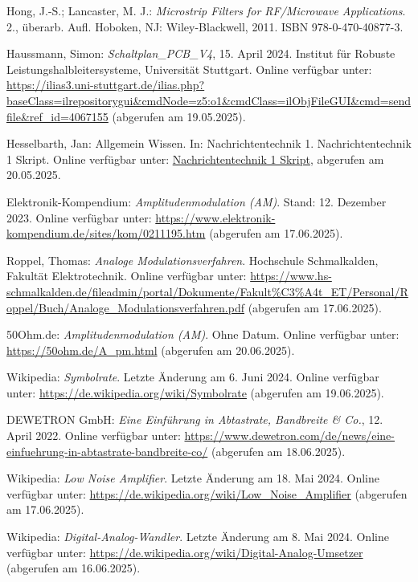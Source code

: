 \begin{thebibliography}{1}
Hong, J.-S.; Lancaster, M. J.: \emph{Microstrip Filters for RF/Microwave Applications}. 2., überarb. Aufl. Hoboken, NJ: Wiley-Blackwell, 2011. ISBN 978-0-470-40877-3.

Haussmann, Simon: \emph{Schaltplan\_PCB\_V4}, 15. April 2024. Institut für Robuste Leistungshalbleitersysteme, Universität Stuttgart. Online verfügbar unter: \url{https://ilias3.uni-stuttgart.de/ilias.php?baseClass=ilrepositorygui&cmdNode=z5:o1&cmdClass=ilObjFileGUI&cmd=sendfile&ref_id=4067155} (abgerufen am 19.05.2025).

Hesselbarth, Jan: Allgemein Wissen. In: Nachrichtentechnik 1. Nachrichtentechnik 1 Skript. Online verfügbar unter: \url{Nachrichtentechnik 1 Skript}, abgerufen am 20.05.2025.


Elektronik-Kompendium: \emph{Amplitudenmodulation (AM)}. Stand: 12. Dezember 2023.  
Online verfügbar unter: \url{https://www.elektronik-kompendium.de/sites/kom/0211195.htm} (abgerufen am 17.06.2025).

Roppel, Thomas: \emph{Analoge Modulationsverfahren}. Hochschule Schmalkalden, Fakultät Elektrotechnik.  
Online verfügbar unter: \url{https://www.hs-schmalkalden.de/fileadmin/portal/Dokumente/Fakult%C3%A4t_ET/Personal/Roppel/Buch/Analoge_Modulationsverfahren.pdf} (abgerufen am 17.06.2025).

50Ohm.de: \emph{Amplitudenmodulation (AM)}. Ohne Datum.  
Online verfügbar unter: \url{https://50ohm.de/A_pm.html} (abgerufen am 20.06.2025).

Wikipedia: \emph{Symbolrate}. Letzte Änderung am 6. Juni 2024.  
Online verfügbar unter: \url{https://de.wikipedia.org/wiki/Symbolrate} (abgerufen am 19.06.2025).

DEWETRON GmbH: \emph{Eine Einführung in Abtastrate, Bandbreite & Co.}, 12. April 2022.  
Online verfügbar unter: \url{https://www.dewetron.com/de/news/eine-einfuehrung-in-abtastrate-bandbreite-co/} (abgerufen am 18.06.2025).

Wikipedia: \emph{Low Noise Amplifier}. Letzte Änderung am 18. Mai 2024.  
Online verfügbar unter: \url{https://de.wikipedia.org/wiki/Low_Noise_Amplifier} (abgerufen am 17.06.2025).

Wikipedia: \emph{Digital-Analog-Wandler}. Letzte Änderung am 8. Mai 2024.  
Online verfügbar unter: \url{https://de.wikipedia.org/wiki/Digital-Analog-Umsetzer} (abgerufen am 16.06.2025).


\end{thebibliography}
